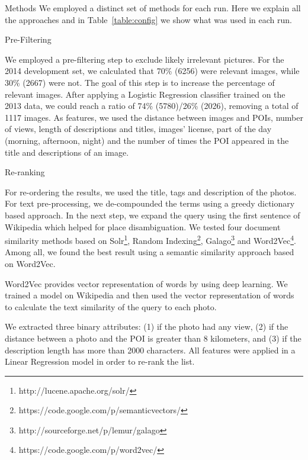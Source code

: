 \documentclass{acm_proc_article-me}
\begin{document}
\begin{section}{Methods}
We employed a distinct set of methods for each run. 
Here we explain all the approaches and in Table~\ref{table:config} we show what was used in each run.

\begin{subsection}{Pre-Filtering}

We employed a pre-filtering step to exclude likely irrelevant pictures.
For the 2014 development set, we calculated that 70\% (6256) were relevant images, while 30\% (2667) were not.
The goal of this step is to increase the percentage of relevant images. 
After applying a Logistic Regression classifier trained on the 2013 data, we could reach a ratio of 74\% (5780)/26\% (2026), removing a total of 1117 images. As features, we used the distance between images and POIs, number of views, length of descriptions and titles, images' license, part of the day (morning, afternoon, night) and the number of times the POI appeared in the title and descriptions of an image.

\end{subsection}


\begin{subsection}{Re-ranking}

For re-ordering the results, we used the title, tags and description of the photos. For text pre-processing, we de-compounded the terms using a greedy dictionary based approach. In the next step, we expand the query using the first sentence of Wikipedia which helped for place disambiguation. We tested four document similarity methods based on Solr\footnote{http://lucene.apache.org/solr/}, Random Indexing\footnote{https://code.google.com/p/semanticvectors/}, Galago\footnote{http://sourceforge.net/p/lemur/galago} and Word2Vec\footnote{https://code.google.com/p/word2vec/}. Among all, we found the best result using a semantic similarity approach based on Word2Vec.

Word2Vec \cite{word2vec} provides vector representation of words by using deep learning. We trained a model on Wikipedia and then used the vector representation of words to calculate the text similarity of the query to each photo.

We extracted three binary attributes: (1) if the photo had any view, (2) if the distance between a photo and the POI is greater than 8 kilometers, and (3) if the description length has more than 2000 characters. All features were applied in a Linear Regression model in order to re-rank the list.


\end{subsection}
\end{section}
\end{document}

